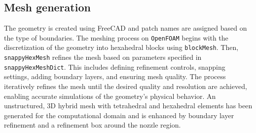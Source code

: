 \subsection{Mesh generation}
The geometry is created using FreeCAD \cite{FreeCAD} and patch names are assigned based on the type of boundaries.  The meshing process on \verb|OpenFOAM| begins with the discretization of the geometry into hexahedral blocks using \verb|blockMesh|. Then, \verb|snappyHexMesh| refines the mesh based on parameters specified in \verb|snappyHexMeshDict|. This includes defining refinement controls, snapping settings, adding boundary layers, and ensuring mesh quality. The process iteratively refines the mesh until the desired quality and resolution are achieved, enabling accurate simulations of the geometry's physical behavior. An unstructured, 3D hybrid mesh with tetrahedral and hexahedral elements has been generated for the computational domain and is enhanced by boundary layer refinement and a refinement box around the nozzle region.
